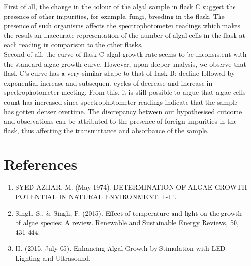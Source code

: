 \documentclass[12pt,a4paper]{IEEEtran}
\begin{document}
    First of all, the change in the colour of the algal sample in flask C suggest the presence of other impurities, for example, fungi, breeding in the flask. The presence of such organisms affects the spectrophotometer readings which makes the result an inaccurate representation of the number of algal cells in the flask at each reading in comparison to the other flasks. \\
    
    Second of all, the curve of flask C algal growth rate seems to be inconsistent with the standard algae growth curve. However, upon deeper analysis, we observe that flask C's curve has a very similar shape to that of flask B: decline followed by exponential increase and subsequent cycles of decrease and increase in spectrophotometer meeting. From this, it is still possible to argue that algae cells count has increased since spectrophotometer readings indicate that the sample has gotten denser overtime. The discrepancy between our hypothesised outcome and observations can be attributed to the presence of foreign impurities in the flask, thus affecting the transmittance and absorbance of the sample. \\ \vspace{-0.1in}
    
    \section{References}
    \begin{enumerate}
    	\item SYED AZHAR, M. (May 1974). DETERMINATION OF ALGAE GROWTH POTENTIAL IN NATURAL ENVIRONMENT. 1-17.
    	\item Singh, S., \& Singh, P. (2015). Effect of temperature and light on the growth of algae species: A review. Renewable and Sustainable Energy Reviews, 50, 431-444.
    	\item H. (2015, July 05). Enhancing Algal Growth by Stimulation with LED Lighting and Ultrasound.
    \end{enumerate}
    
\end{document}
